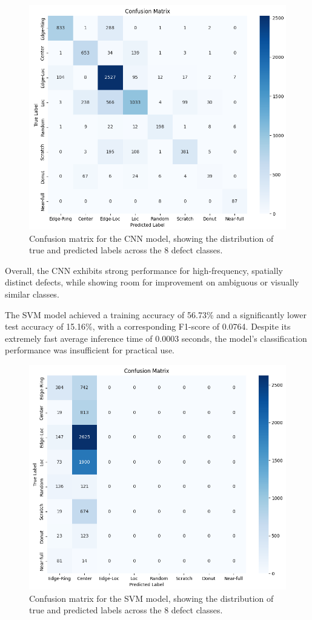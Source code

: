 \documentclass[conference]{IEEEtran}
\begin{document}
\begin{figure}[h]
    \centering
    \includegraphics[width=0.9\linewidth]{assets/cnn_conf_matrix.png}
    \caption{Confusion matrix for the CNN model, showing the distribution of true and predicted labels across the 8 defect classes.}
    \label{fig:cnn_confusion_matrix}
\end{figure}

Overall, the CNN exhibits strong performance for high-frequency, spatially distinct defects, while showing room for improvement on ambiguous or visually similar classes.

The SVM model achieved a training accuracy of 56.73\% and a significantly lower test accuracy of 15.16\%, with a corresponding F1-score of 0.0764. 
Despite its extremely fast average inference time of 0.0003 seconds, the model's classification performance was insufficient for practical use.

\begin{figure}[h]
    \centering
    \includegraphics[width=0.9\linewidth]{assets/svm_conf_matrix.png}
    \caption{Confusion matrix for the SVM model, showing the distribution of true and predicted labels across the 8 defect classes.}
    \label{fig:svm_confusion_matrix}
\end{figure}
\end{document}
